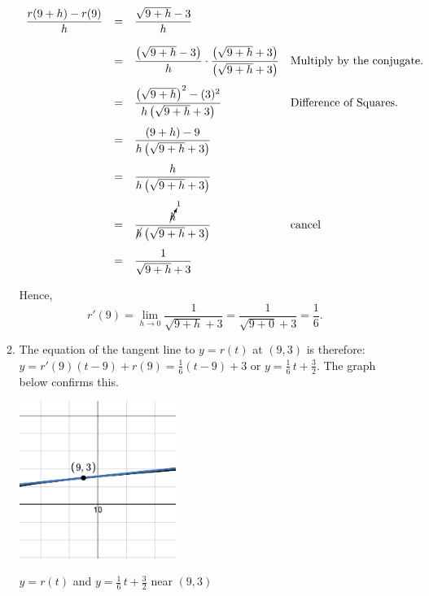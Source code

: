 \documentclass{ximera}
\begin{document}
\begin{ex}
\begin{enumerate}
\begin{enumerate}
\[\begin{array}{rcll}
\dfrac{r(9+h) - r(9)}{h} & = & \dfrac{\sqrt{9+h} - 3}{h} & \\[15pt]
												
												 & = & \dfrac{\left(\sqrt{9+h} - 3 \right)}{h} \cdot \dfrac{\left(\sqrt{9+h} + 3\right)}{\left(\sqrt{9+h} + 3\right)} & \text{Multiply by the conjugate.} \\[15pt]
										
												 & = &  \dfrac{\left(\sqrt{9+h}\right)^2 -(3)^2}{h\left(\sqrt{9+h} + 3\right)} & \text{Difference of Squares.}\\[15pt]
												
												& = &  \dfrac{(9+h) - 9}{h\left(\sqrt{9+h} + 3\right)} & \\[15pt]
												
												 & = &  \dfrac{h}{h\left(\sqrt{9+h} + 3\right)} & \\[15pt]
												 
												 & = &  \dfrac{\cancelto{1}{h}}{\cancel{h}\left(\sqrt{9+h} + 3\right)} & \text{cancel} \\[15pt]
										
										
												 & = &  \dfrac{1}{\sqrt{9+h} +3} & \\ 
												\end{array}\]	


Hence, \[ r'(9) = \lim_{h \rightarrow 0} \frac{1}{\sqrt{9+h} +3} = \frac{1}{\sqrt{9+0} +3} = \frac{1}{6}.\]

\item  The equation of the tangent line to $y = r(t)$ at $(9,3)$ is therefore:  $y = r'(9)(t-9) + r(9) = \frac{1}{6} (t-9) + 3$ or $y = \frac{1}{6} \, t + \frac{3}{2}$. The graph below confirms this.

 \begin{center}

 \includegraphics[width=2in]{./IntroductiontoDerivativesGraphics/TLEx203.png} 
 
 $y =r(t)$ and   $y = \frac{1}{6} \, t + \frac{3}{2}$  near $(9,3)$  


\end{center}
\end{enumerate}
\end{enumerate}
\end{ex}
\end{document}
